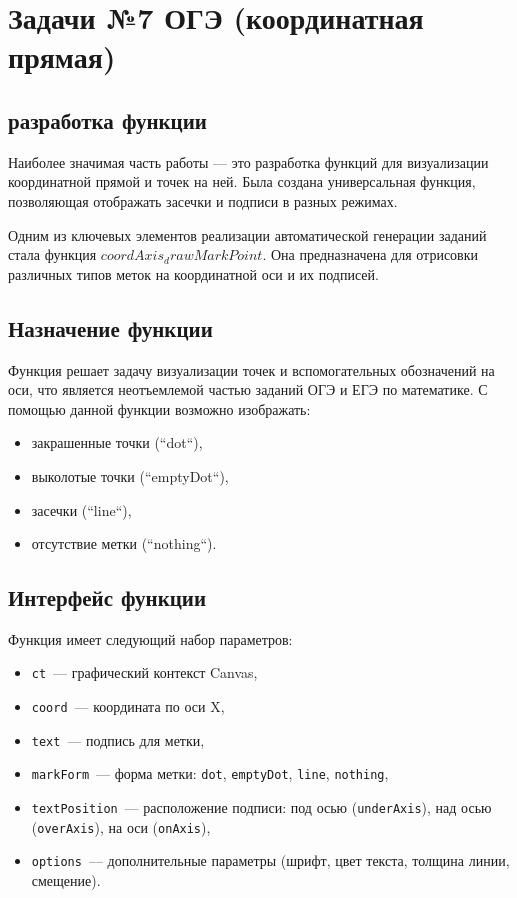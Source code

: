 \section{Задачи №7 ОГЭ (координатная прямая)}

\subsection{разработка функции}
Наиболее значимая часть работы — это разработка функций для визуализации координатной прямой и точек на ней. 
Была создана универсальная функция, позволяющая отображать засечки и подписи в разных режимах.

Одним из ключевых элементов реализации автоматической генерации заданий стала функция $coordAxis_drawMarkPoint$. Она предназначена для отрисовки различных типов меток на координатной оси и их подписей.

\subsection{Назначение функции}
Функция решает задачу визуализации точек и вспомогательных обозначений на оси,
что является неотъемлемой частью заданий ОГЭ и ЕГЭ по математике.
С помощью данной функции возможно изображать:
\begin{itemize}
    \item закрашенные точки (``dot``),
    \item выколотые точки (``emptyDot``),
    \item засечки (``line``),
    \item отсутствие метки (``nothing``).
\end{itemize}

 

\subsection{Интерфейс функции}
Функция имеет следующий набор параметров:
\begin{itemize}
    \item \texttt{ct}~— графический контекст Canvas,
    \item \texttt{coord}~— координата по оси X,
    \item \texttt{text}~— подпись для метки,
    \item \texttt{markForm}~— форма метки: \texttt{dot}, \texttt{emptyDot}, \texttt{line}, \texttt{nothing},
    \item \texttt{textPosition}~— расположение подписи: под осью (\texttt{underAxis}), над осью (\texttt{overAxis}), на оси (\texttt{onAxis}),
    \item \texttt{options}~— дополнительные параметры (шрифт, цвет текста, толщина линии, смещение).
\end{itemize}

